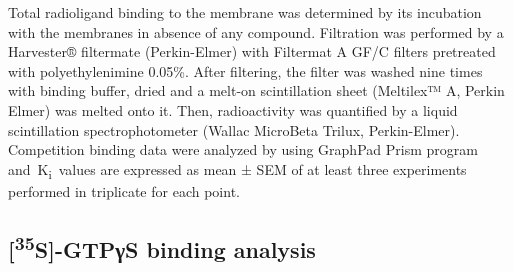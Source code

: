 \documentclass[empirical, authordate]{jote-new-article}
\begin{document}
Total radioligand binding to the membrane was determined by its incubation with the membranes in absence of any compound. Filtration was performed by a Harvester® filtermate (Perkin-Elmer) with Filtermat A GF/C filters pretreated with polyethylenimine 0.05\%. After filtering, the filter was washed nine times with binding buffer, dried and a melt-on scintillation sheet (Meltilex™ A, Perkin Elmer) was melted onto it. Then, radioactivity was quantified by a liquid scintillation spectrophotometer (Wallac MicroBeta Trilux, Perkin-Elmer). Competition binding data were analyzed by using GraphPad Prism program and K\textsubscript{i} values are expressed as mean ± SEM of at least three experiments performed in triplicate for each point.

\subsection{[\textsuperscript{35}S]-GTPγS binding analysis}
\end{document}
